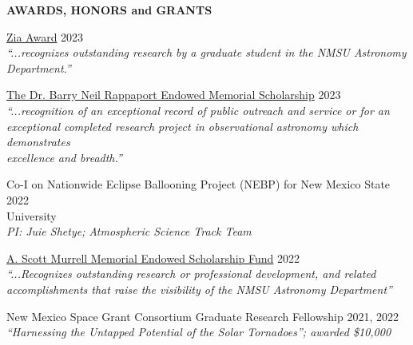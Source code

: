 \documentclass{resume} %
\begin{document}
\vspace{-0.1in}
\begin{rSection}{\textbf{AWARDS, HONORS and GRANTS}}
\vspace{0.02in}

{\href{https://astro.nmsu.edu/fellowships/zia.html}{Zia Award}}
\hfill{2023} \\
\emph{``...recognizes outstanding research by a graduate student in the NMSU Astronomy \\ Department.''}

{\href{https://astro.nmsu.edu/fellowships/rappaport.html}{The Dr. Barry Neil Rappaport Endowed Memorial Scholarship}}
\hfill{2023} \\
\emph{``...recognition of an exceptional record of public outreach and service or for an \\ exceptional completed research project in observational astronomy which demonstrates \\ excellence and breadth.''}

{Co-I on Nationwide Eclipse Ballooning Project (NEBP) for New Mexico State \hfill{2022} \\ University} \\
\emph{PI: Juie Shetye;} \emph{Atmospheric Science Track Team}

{\href{https://astro.nmsu.edu/fellowships/murrell.html}{A. Scott Murrell Memorial Endowed Scholarship Fund}}
\hfill{2022} \\
\emph{``...Recognizes outstanding research or professional development, and related \\ accomplishments that raise the visibility of the NMSU Astronomy Department''}

{New Mexico Space Grant Consortium Graduate Research Fellowship } \hfill{2021, 2022} \\
\emph{``Harnessing the Untapped Potential of the Solar Tornadoes''; awarded \$10,000}
\end{rSection}
\end{document}
